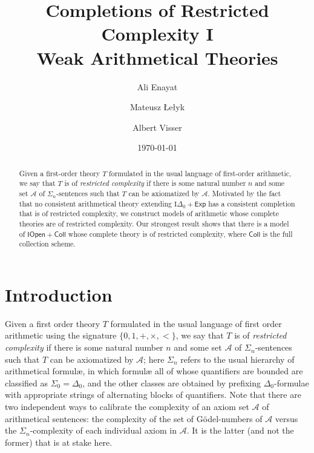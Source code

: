 \documentclass{amsart}
\title[Completions of Restricted Complexity]{Completions of Restricted Complexity I\\
Weak Arithmetical Theories}
\author{Ali Enayat}
\author{Mateusz \L{}e\l{}yk}
\author{Albert Visser}
\date{\today}
\newcommand{\mc}[1]{\mathcal #1}
\begin{document}




\begin{abstract}
Given a first-order theory $T$ formulated in the usual language of first-order arithmetic, we say that $T$ is of 
\emph{restricted complexity} if there is some natural number $n$ and some set $\mc{A}$
of $\Sigma_n$-sentences such that $T$ can 
be axiomatized by $\mc{A}$. Motivated by the fact that no consistent arithmetical theory extending $\mathrm{I}\Delta _{0}+\mathsf{Exp}$ 
has a consistent completion that is of restricted complexity, we construct models of arithmetic whose complete theories are 
of restricted complexity. Our strongest result shows that there is a model of $\mathsf{IOpen + Coll}$ 
whose complete theory is of restricted complexity, where $\mathsf{Coll}$ is the full collection scheme.
\end{abstract}

\maketitle

\section{Introduction}\label{sec_introd}
Given a first order theory $T$ formulated in the usual language of first order arithmetic using the 
signature  $\{0, 1, +, \times, <\}$, we say that $T$ is of \emph{restricted complexity} if there is some natural number $n$ 
and some set $\mc{A}$ of $\Sigma_n$-sentences such that $T$ can be axiomatized by $\mc{A}$; here $\Sigma _{n}$ refers 
to the usual hierarchy of arithmetical formul{\ae}, in which formul{\ae} all of whose quantifiers are bounded are 
classified as $\Sigma _{0}=\Delta_{0}$, and the other classes are obtained by prefixing $\Delta_{0}$-formulae with appropriate strings 
of alternating blocks of quantifiers. Note that there are two independent ways to calibrate the complexity of an axiom set $\mc{A}$ 
of arithmetical sentences: the complexity of the set of G\"{o}del-numbers of $\mc{A}$ versus the $\Sigma_n$-complexity of each 
individual axiom in $\mc{A}$. It is the latter (and not the former) that is at stake here.
\end{document}
